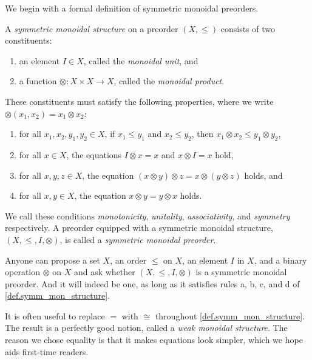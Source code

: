 \documentclass[7Sketches]{subfiles}
\begin{document}
We begin with a formal definition of symmetric monoidal preorders.

\begin{definition}%
\label{def.symm_mon_structure}%
%
A  \emph{symmetric monoidal structure} on a preorder $(X,\leq)$ consists of two constituents:
\begin{enumerate}[label=(\roman*)]
	\item an element $I\in X$, called the \emph{monoidal unit}, and%
	\item a function $\otimes \colon X\times X\to X$, called the \emph{monoidal product}.%
%
\end{enumerate}
These constituents must satisfy the following properties, where we write $\otimes(x_1,x_2) = x_1 \otimes x_2$:%
\begin{enumerate}[label=(\alph*)]
	\item for all $x_1,x_2,y_1,y_2\in X$, if $x_1\leq y_1$ and $x_2\leq y_2$, then $x_1\otimes x_2\leq y_1\otimes y_2$,
	\item for all $x\in X$, the equations $I\otimes x= x$ and $x\otimes I= x$ hold,
	\item for all $x,y,z\in X$, the equation $(x\otimes y)\otimes z= x\otimes (y\otimes z)$ holds, and
	\item for all $x,y\in X$, the equation $x\otimes y = y\otimes x$ holds.%
\end{enumerate}
We call these conditions \emph{monotonicity}, \emph{unitality},
\emph{associativity}, and \emph{symmetry} respectively.
A preorder equipped with a symmetric monoidal structure, $(X,\leq,I,\otimes)$, is called a \emph{symmetric monoidal preorder}.%
%
%
%
\end{definition}

Anyone can propose a set $X$, an order $\leq$ on $X$, an element $I$ in $X$, and a binary operation $\otimes$ on $X$ and ask whether $(X,\leq,I,\otimes)$ is a symmetric monoidal preorder. And it will indeed be one, as long as it satisfies rules a, b, c, and d of \cref{def.symm_mon_structure}.

\begin{remark}
It is often useful to replace $=$ with $\cong$ throughout
\cref{def.symm_mon_structure}. The result is a perfectly good notion, called a
\emph{weak monoidal structure}. The reason we chose equality is that it makes
equations look simpler, which we hope aids first-time readers.%
\end{remark}
\end{document}
